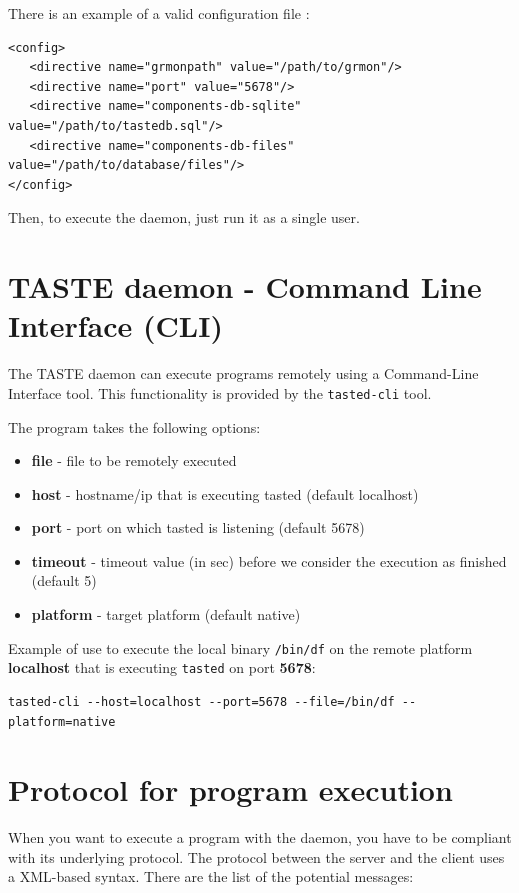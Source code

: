 \documentclass[11pt]{book}
\begin{document}
   There is an example of a valid configuration file :
\begin{verbatim}
<config>
   <directive name="grmonpath" value="/path/to/grmon"/>
   <directive name="port" value="5678"/>
   <directive name="components-db-sqlite" value="/path/to/tastedb.sql"/>
   <directive name="components-db-files" value="/path/to/database/files"/>
</config>
\end{verbatim}

   Then, to execute the daemon, just run it as a single user.

   \section{TASTE daemon - Command Line Interface (CLI)}
   The TASTE daemon can execute programs remotely using a Command-Line Interface
   tool. This functionality is provided by the \texttt{tasted-cli} tool.

   The program takes the following options:
   \begin{itemize}
      \item
         \textbf{file} - file to be remotely executed
      \item
         \textbf{host} - hostname/ip that is executing tasted (default localhost)
      \item
         \textbf{port} - port on which tasted is listening (default 5678)
      \item
         \textbf{timeout} - timeout value (in sec) before we consider the execution as finished (default 5)
      \item
         \textbf{platform} - target platform (default native)
   \end{itemize}

   Example of use to execute the local binary \texttt{/bin/df} on the remote platform
   \textbf{localhost} that is executing \texttt{tasted} on port \textbf{5678}:
\begin{verbatim}
tasted-cli --host=localhost --port=5678 --file=/bin/df --platform=native
\end{verbatim}

   \section{Protocol for program execution}
   When you want to execute a program with the daemon, you have to be compliant
   with its underlying protocol. The protocol between the server and the client
   uses a XML-based syntax. There are the list of the potential messages:
\end{document}
